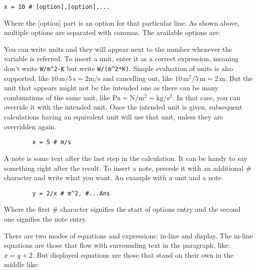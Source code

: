 \documentclass[12pt]{article}
\begin{document}
\begin{verbatim}
x = 10 # [option],[option],...
\end{verbatim}

Where the [option] part is an option for that particular line.  As shown above,
multiple options are separated with commas. The available options are:

\begin{description}
    \setlength\itemsep{0pt}
    \item[Unit] You can write units and they will appear next to the number
        whenever the variable is referred. To insert a unit, enter it as a
        correct expression, meaning don't write \verb|W/m^2-K| but write
        \verb|W/(m^2*K)|. Simple evaluation of units is also supported, like
        $\mathrm{10\,m/5\,s=2m/s}$ and cancelling out, like
        $\mathrm{10\,m^2/5\,m=2\,m}$. But the unit that appears might not be
        the intended one as there can be many combinations of the same unit,
        like $\mathrm{Pa = N/m^2 = kg/s^2}$. In that case, you can override it
        with the intended unit. Once the intended unit is given, subsequent
        calculations having an equivalent unit will use that unit, unless they
        are overridden again.

        \begin{verbatim}
        x = 5 # m/s
        \end{verbatim}

    \item[Note] A note is some text after the last step in the calculation. It
        can be handy to say something right after the result. To insert a note,
        precede it with an additional \# character and write what you want. An
        example with a unit and a note

        \begin{verbatim}
        y = 2/x # m^2, #...Ans
        \end{verbatim}

        Where the first \# character signifies the start of options entry and
        the second one signifies the note entry.

    \item[Display or Inline] There are two modes of equations and expressions:
        in-line and display. The in-line equations are those that flow with
        surrounding text in the paragraph, like: $x = y + 2$. But displayed
        equations are those that stand on their own in the middle like:


\end{description}
\end{document}
